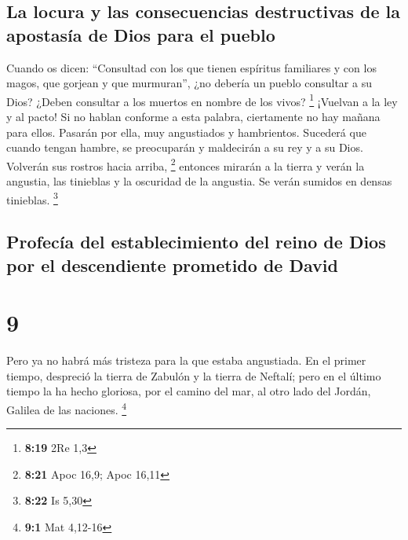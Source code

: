 \hypertarget{la-locura-y-las-consecuencias-destructivas-de-la-apostasuxeda-de-dios-para-el-pueblo}{%
\subsection{La locura y las consecuencias destructivas de la apostasía
de Dios para el
pueblo}\label{la-locura-y-las-consecuencias-destructivas-de-la-apostasuxeda-de-dios-para-el-pueblo}}

 Cuando os dicen: ``Consultad con los que tienen
espíritus familiares y con los magos, que gorjean y que murmuran'', ¿no
debería un pueblo consultar a su Dios? ¿Deben consultar a los muertos en
nombre de los vivos? \footnote{\textbf{8:19} 2Re 1,3} 
¡Vuelvan a la ley y al pacto! Si no hablan conforme a esta palabra,
ciertamente no hay mañana para ellos.  Pasarán por ella,
muy angustiados y hambrientos. Sucederá que cuando tengan hambre, se
preocuparán y maldecirán a su rey y a su Dios. Volverán sus rostros
hacia arriba, \footnote{\textbf{8:21} Apoc 16,9; Apoc 16,11}
 entonces mirarán a la tierra y verán la angustia, las
tinieblas y la oscuridad de la angustia. Se verán sumidos en densas
tinieblas. \footnote{\textbf{8:22} Is 5,30}

\hypertarget{profecuxeda-del-establecimiento-del-reino-de-dios-por-el-descendiente-prometido-de-david}{%
\subsection{Profecía del establecimiento del reino de Dios por el
descendiente prometido de
David}\label{profecuxeda-del-establecimiento-del-reino-de-dios-por-el-descendiente-prometido-de-david}}

\hypertarget{section-8}{%
\section{9}\label{section-8}}

 Pero ya no habrá más tristeza para la que estaba
angustiada. En el primer tiempo, despreció la tierra de Zabulón y la
tierra de Neftalí; pero en el último tiempo la ha hecho gloriosa, por el
camino del mar, al otro lado del Jordán, Galilea de las naciones.
\footnote{\textbf{9:1} Mat 4,12-16}

